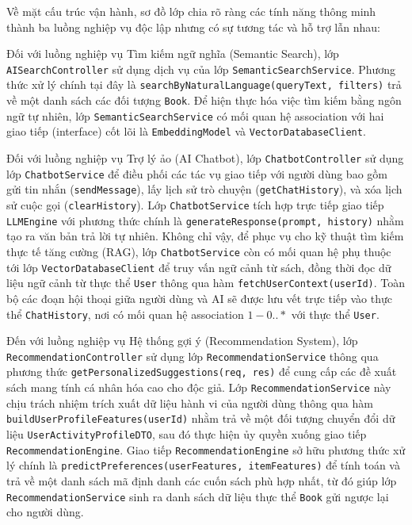 Về mặt cấu trúc vận hành, sơ đồ lớp chia rõ ràng các tính năng thông minh thành ba luồng nghiệp vụ độc lập nhưng có sự tương tác và hỗ trợ lẫn nhau:

Đối với luồng nghiệp vụ Tìm kiếm ngữ nghĩa (Semantic Search), lớp \texttt{AISearchController} sử dụng dịch vụ của lớp \texttt{SemanticSearchService}. Phương thức xử lý chính tại đây là \texttt{searchByNaturalLanguage(queryText, filters)} trả về một danh sách các đối tượng \texttt{Book}. Để hiện thực hóa việc tìm kiếm bằng ngôn ngữ tự nhiên, lớp \texttt{SemanticSearchService} có mối quan hệ association với hai giao tiếp (interface) cốt lõi là \texttt{EmbeddingModel} và \texttt{VectorDatabaseClient}.

Đối với luồng nghiệp vụ Trợ lý ảo (AI Chatbot), lớp \texttt{ChatbotController} sử dụng lớp \texttt{ChatbotService} để điều phối các tác vụ giao tiếp với người dùng bao gồm gửi tin nhắn (\texttt{sendMessage}), lấy lịch sử trò chuyện (\texttt{getChatHistory}), và xóa lịch sử cuộc gọi (\texttt{clearHistory}). Lớp \texttt{ChatbotService} tích hợp trực tiếp giao tiếp \texttt{LLMEngine} với phương thức chính là \texttt{generateResponse(prompt, history)} nhằm tạo ra văn bản trả lời tự nhiên. Không chỉ vậy, để phục vụ cho kỹ thuật tìm kiếm thực tế tăng cường (RAG), lớp \texttt{ChatbotService} còn có mối quan hệ phụ thuộc tới lớp \texttt{VectorDatabaseClient} để truy vấn ngữ cảnh từ sách, đồng thời đọc dữ liệu ngữ cảnh từ thực thể \texttt{User} thông qua hàm \texttt{fetchUserContext(userId)}. Toàn bộ các đoạn hội thoại giữa người dùng và AI sẽ được lưu vết trực tiếp vào thực thể \texttt{ChatHistory}, nơi có mối quan hệ association $1 - 0..*$ với thực thể \texttt{User}.

Đến với luồng nghiệp vụ Hệ thống gợi ý (Recommendation System), lớp \texttt{RecommendationController} sử dụng lớp \texttt{RecommendationService} thông qua phương thức \texttt{getPersonalizedSuggestions(req, res)} để cung cấp các đề xuất sách mang tính cá nhân hóa cao cho độc giả. Lớp \texttt{RecommendationService} này chịu trách nhiệm trích xuất dữ liệu hành vi của người dùng thông qua hàm \texttt{buildUserProfileFeatures(userId)} nhằm trả về một đối tượng chuyển đổi dữ liệu \texttt{UserActivityProfileDTO}, sau đó thực hiện ủy quyền xuống giao tiếp \texttt{RecommendationEngine}. Giao tiếp \texttt{RecommendationEngine} sở hữu phương thức xử lý chính là \texttt{predictPreferences(userFeatures, itemFeatures)} để tính toán và trả về một danh sách mã định danh các cuốn sách phù hợp nhất, từ đó giúp lớp \texttt{RecommendationService} sinh ra danh sách dữ liệu thực thể \texttt{Book} gửi ngược lại cho người dùng.

